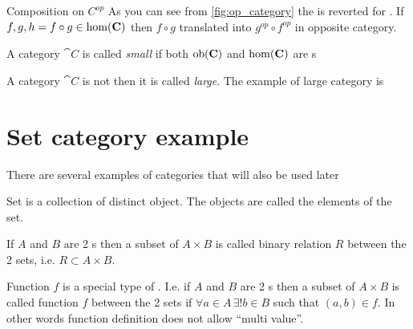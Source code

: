 \begin{remark}{Composition on $C^{op}$}
\label{rem:op_composition}
As you can see from \cref{fig:op_category} the
 is reverted for
. If $f,g,h = f \circ g \in
\mathrm{hom}(\mathbf{C})$ then $f \circ g$ translated into $g^{op} \circ
f^{op}$ in opposite category.
\end{remark}

\begin{definition}
\label{def:small_category}
A category $\cat{C}$ is called \textit{small} if both $\mathrm{ob}(\mathbf{C})$ and
$\mathrm{hom}(\mathbf{C})$ are s
\end{definition}

\begin{definition}
\label{def:large_category}
A category $\cat{C}$ is not  then it is
called \textit{large}. The example of large category is
\end{definition}

\section{\textbf{Set} category example}

There are several examples of categories that will also be used later

\begin{definition}[Set]
  \label{def:set}
  Set is a collection of distinct object. The objects are called the
  elements of the set.
\end{definition}

\begin{definition}
  \label{def:binary_relation}
  If $A$ and $B$ are 2 s then a subset of $A \times B$ is
  called binary relation $R$ between the 2 sets, i.e. $R \subset A \times B$.
\end{definition}

\begin{definition}[Function]
  \label{def:function}
  Function $f$ is a special type of . I.e.
  if $A$ and $B$ are 2 s then a subset of $A \times B$ is
  called function $f$ between the 2 sets if $\forall a \in A \, \exists!
  b \in B$ such that $(a,b) \in f$. In other words function definition
  does not allow ``multi value''.
\end{definition}

